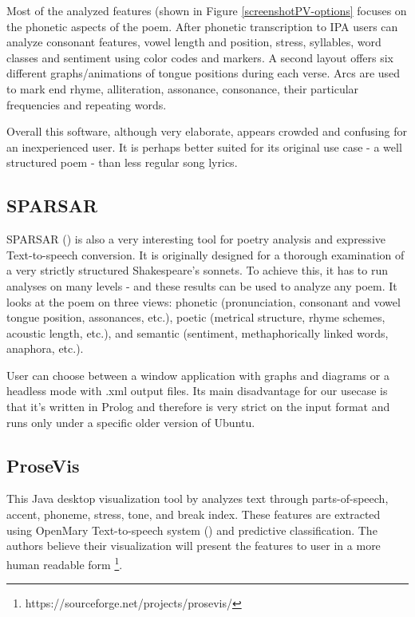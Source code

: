 Most of the analyzed features (shown in Figure \ref{screenshotPV-options} focuses on the phonetic aspects of the poem. After phonetic transcription to IPA users can analyze consonant features, vowel length and position, stress, syllables, word classes and sentiment using color codes and markers. A second layout offers six different graphs/animations of tongue positions during each verse. Arcs are used to mark end rhyme, alliteration, assonance, consonance, their particular frequencies and repeating words.


Overall this software, although very elaborate, appears crowded and confusing for an inexperienced user. It is perhaps better suited for its original use case - a well structured poem - than less regular song lyrics.

\subsection{SPARSAR}
SPARSAR (\cite{Delmonte2014}) is also a very interesting tool for poetry analysis and expressive Text-to-speech conversion. It is originally designed for a thorough examination of a very strictly structured Shakespeare's sonnets. To achieve this, it has to run analyses on many levels - and these results can be used to analyze any poem. It looks at the poem on three views: phonetic (pronunciation, consonant and vowel tongue position, assonances, etc.), poetic (metrical structure, rhyme schemes, acoustic length, etc.), and semantic (sentiment, methaphorically linked words, anaphora, etc.).

User can choose between a window application with graphs and diagrams or a headless mode with .xml output files. Its main disadvantage for our usecase is that it's written in Prolog and therefore is very strict on the input format and runs only under a specific older version of Ubuntu. 

\subsection{ProseVis}
This Java desktop visualization tool by \cite{Clement2013} analyzes text through
parts-of-speech, accent, phoneme, stress, tone, and break index. These features are extracted using OpenMary Text-to-speech system (\cite{Schroder2006}) and predictive classification. The authors believe their visualization will present the features to user in a more human readable form \footnote{https://sourceforge.net/projects/prosevis/}.

